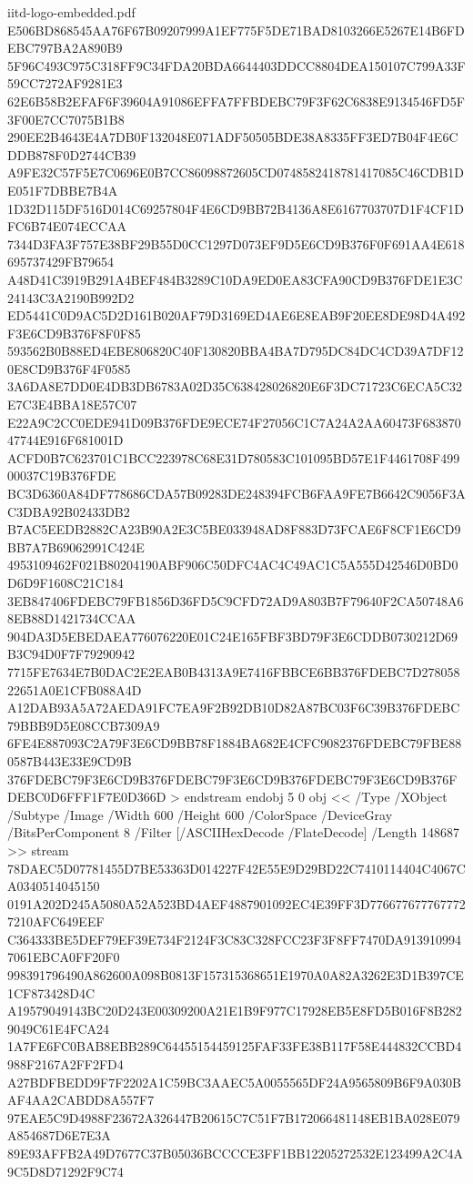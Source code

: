 \begin{filecontents*}[overwrite]{iitd-logo-embedded.pdf}
E506BD868545AA76F67B09207999A1EF775F5DE71BAD8103266E5267E14B6FDEBC797BA2A890B9
5F96C493C975C318FF9C34FDA20BDA6644403DDCC8804DEA150107C799A33F59CC7272AF9281E3
62E6B58B2EFAF6F39604A91086EFFA7FFBDEBC79F3F62C6838E9134546FD5F3F00E7CC7075B1B8
290EE2B4643E4A7DB0F132048E071ADF50505BDE38A8335FF3ED7B04F4E6CDDB878F0D2744CB39
A9FE32C57F5E7C0696E0B7CC86098872605CD0748582418781417085C46CDB1DE051F7DBBE7B4A
1D32D115DF516D014C69257804F4E6CD9BB72B4136A8E6167703707D1F4CF1DFC6B74E074ECCAA
7344D3FA3F757E38BF29B55D0CC1297D073EF9D5E6CD9B376F0F691AA4E618695737429FB79654
A48D41C3919B291A4BEF484B3289C10DA9ED0EA83CFA90CD9B376FDE1E3C24143C3A2190B992D2
ED5441C0D9AC5D2D161B020AF79D3169ED4AE6E8EAB9F20EE8DE98D4A492F3E6CD9B376F8F0F85
593562B0B88ED4EBE806820C40F130820BBA4BA7D795DC84DC4CD39A7DF120E8CD9B376F4F0585
3A6DA8E7DD0E4DB3DB6783A02D35C638428026820E6F3DC71723C6ECA5C32E7C3E4BBA18E57C07
E22A9C2CC0EDE941D09B376FDE9ECE74F27056C1C7A24A2AA60473F68387047744E916F681001D
ACFD0B7C623701C1BCC223978C68E31D780583C101095BD57E1F4461708F49900037C19B376FDE
BC3D6360A84DF778686CDA57B09283DE248394FCB6FAA9FE7B6642C9056F3AC3DBA92B02433DB2
B7AC5EEDB2882CA23B90A2E3C5BE033948AD8F883D73FCAE6F8CF1E6CD9BB7A7B69062991C424E
4953109462F021B80204190ABF906C50DFC4AC4C49AC1C5A555D42546D0BD0D6D9F1608C21C184
3EB847406FDEBC79FB1856D36FD5C9CFD72AD9A803B7F79640F2CA50748A68EB88D1421734CCAA
904DA3D5EBEDAEA776076220E01C24E165FBF3BD79F3E6CDDB0730212D69B3C94D0F7F79290942
7715FE7634E7B0DAC2E2EAB0B4313A9E7416FBBCE6BB376FDEBC7D27805822651A0E1CFB088A4D
A12DAB93A5A72AEDA91FC7EA9F2B92DB10D82A87BC03F6C39B376FDEBC79BBB9D5E08CCB7309A9
6FE4E887093C2A79F3E6CD9BB78F1884BA682E4CFC9082376FDEBC79FBE880587B443E33E9CD9B
376FDEBC79F3E6CD9B376FDEBC79F3E6CD9B376FDEBC79F3E6CD9B376FDEBC0D6FFF1F7E0D366D
>
endstream
endobj
5 0 obj
<< /Type /XObject /Subtype /Image /Width 600 /Height 600 /ColorSpace /DeviceGray /BitsPerComponent 8 /Filter [/ASCIIHexDecode /FlateDecode] /Length 148687 >>
stream
78DAEC5D07781455D7BE53363D014227F42E55E9D29BD22C7410114404C4067CA0340514045150
0191A202D245A5080A52A523BD4AEF4887901092EC4E39FF3D7766776777677727210AFC649EEF
C364333BE5DEF79EF39E734F2124F3C83C328FCC23F3F8FF7470DA9139109947061EBCA0FF20F0
998391796490A862600A098B0813F157315368651E1970A0A82A3262E3D1B397CE1CF873428D4C
A19579049143BC20D243E00309200A21E1B9F977C17928EB5E8FD5B016F8B2829049C61E4FCA24
1A7FE6FC0BAB8EBB289C64455154459125FAF33FE38B117F58E444832CCBD4988F2167A2FF2FD4
A27BDFBEDD9F7F2202A1C59BC3AAEC5A0055565DF24A9565809B6F9A030BAF4AA2CABDD8A557F7
97EAE5C9D4988F23672A326447B20615C7C51F7B172066481148EB1BA028E079A854687D6E7E3A
89E93AFFB2A49D7677C37B05036BCCCCE3FF1BB12205272532E123499A2C4A9C5D8D71292F9C74

\end{filecontents*}
